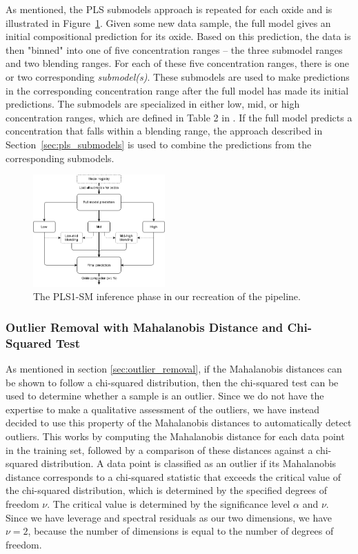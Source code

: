 As mentioned, the PLS submodels approach is repeated for each oxide and is illustrated in Figure~\ref{fig:pls_inference}.
Given some new data sample, the full model gives an initial compositional prediction for its oxide.
Based on this prediction, the data is then "binned" into one of five concentration ranges -- the three submodel ranges and two blending ranges.
For each of these five concentration ranges, there is one or two corresponding \textit{submodel(s)}.
These submodels are used to make predictions in the corresponding concentration range after the full model has made its initial predictions.
The submodels are specialized in either low, mid, or high concentration ranges, which are defined in Table 2 in \citet{andersonImprovedAccuracyQuantitative2017}.
If the full model predicts a concentration that falls within a blending range, the approach described in Section~\ref{sec:pls_submodels} is used to combine the predictions from the corresponding submodels.

\begin{figure}
	\centering
	\includegraphics[width=0.45\textwidth]{images/pls_inference.png}
	\caption{The PLS1-SM inference phase in our recreation of the pipeline.}
	\label{fig:pls_inference}
\end{figure}

\subsubsection{Outlier Removal with Mahalanobis Distance and Chi-Squared Test}\label{sec:methodology_outlier_removal}
As mentioned in section \ref{sec:outlier_removal}, if the Mahalanobis distances can be shown to follow a chi-squared distribution, then the chi-squared test can be used to determine whether a sample is an outlier.
Since we do not have the expertise to make a qualitative assessment of the outliers, we have instead decided to use this property of the Mahalanobis distances to automatically detect outliers.
This works by computing the Mahalanobis distance for each data point in the training set, followed by a comparison of these distances against a chi-squared distribution.
A data point is classified as an outlier if its Mahalanobis distance corresponds to a chi-squared statistic that exceeds the critical value of the chi-squared distribution, which is determined by the specified degrees of freedom $\nu$.
The critical value is determined by the significance level $\alpha$ and $\nu$.
Since we have leverage and spectral residuals as our two dimensions, we have $\nu = 2$, because the number of dimensions is equal to the number of degrees of freedom\cite{aggarwal_outlier_2017}.

